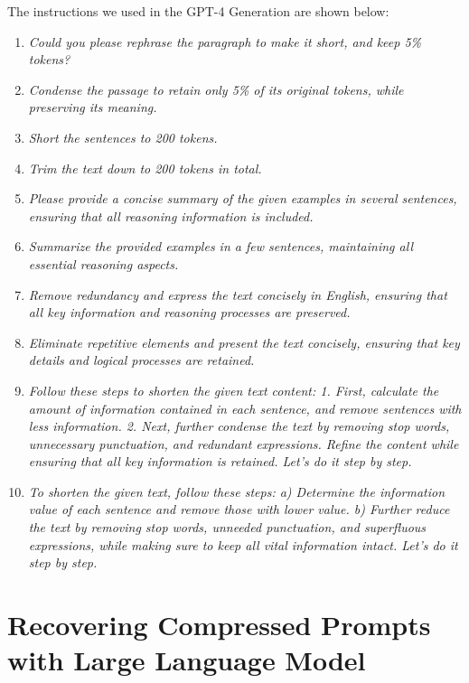 The instructions we used in the GPT-4 Generation are shown below:
\begin{enumerate}
    \setlength{\itemsep}{-0.1cm}
    \item \textit{Could you please rephrase the paragraph to make it short, and keep 5\% tokens?}
    \item \textit{Condense the passage to retain only 5\% of its original tokens, while preserving its meaning.}
\item \textit{Short the sentences to 200 tokens.}
\item \textit{Trim the text down to 200 tokens in total.}
\item \textit{Please provide a concise summary of the given examples in several sentences, ensuring that all reasoning information is included.}
\item \textit{Summarize the provided examples in a few sentences, maintaining all essential reasoning aspects.}
\item \textit{Remove redundancy and express the text concisely in English, ensuring that all key information and reasoning processes are preserved.}
\item \textit{Eliminate repetitive elements and present the text concisely, ensuring that key details and logical processes are retained.}
\item \textit{Follow these steps to shorten the given text content: 1. First, calculate the amount of information contained in each sentence, and remove sentences with less information. 2. Next, further condense the text by removing stop words, unnecessary punctuation, and redundant expressions. Refine the content while ensuring that all key information is retained. Let's do it step by step.}
\item \textit{To shorten the given text, follow these steps: a) Determine the information value of each sentence and remove those with lower value. b) Further reduce the text by removing stop words, unneeded punctuation, and superfluous expressions, while making sure to keep all vital information intact. Let's do it step by step.}
\end{enumerate}




\section{Recovering Compressed Prompts with Large Language Model}
\label{sec:recover_cases}

